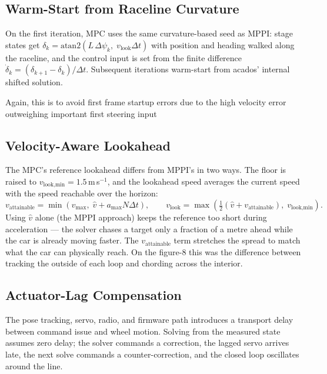 \documentclass[11pt]{article}
\begin{document}
\subsection{Warm-Start from Raceline Curvature}

On the first iteration, MPC uses the same curvature-based seed as MPPI:
stage states get
$\delta_k = \mathrm{atan2}(L\,\Delta\psi_k,\; v_{\text{look}}\Delta t)$ with
position and heading walked along the raceline, and the control input is set
from the finite difference $\dot{\delta}_k = (\delta_{k+1} - \delta_k)/\Delta t$.
Subsequent iterations warm-start from acados' internal shifted solution.

Again, this is to avoid first frame startup errors due to the high velocity error outweighing important first steering input

\subsection{Velocity-Aware Lookahead}

The MPC's reference lookahead differs from MPPI's in two ways.  The floor
is raised to $v_{\text{look,min}} = 1.5$\,m\,s$^{-1}$, and the lookahead
speed averages the current speed with the speed reachable over the horizon:
\[
v_{\text{attainable}} = \min(v_{\max},\; \hat{v} + a_{\max} N \Delta t),
\qquad
v_{\text{look}} = \max\!\left(\tfrac{1}{2}(\hat{v} + v_{\text{attainable}}),\;
                              v_{\text{look,min}}\right).
\]
Using $\hat{v}$ alone (the MPPI approach) keeps the reference too short
during acceleration --- the solver chases a target only a fraction of a
metre ahead while the car is already moving faster.  The
$v_{\text{attainable}}$ term stretches the spread to match what the car
can physically reach.  On the figure-8 this was the difference between
tracking the outside of each loop and chording across the interior.

\subsection{Actuator-Lag Compensation}

The pose tracking, servo, radio, and firmware path introduces a transport delay between
command issue and wheel motion.  Solving from the measured state assumes
zero delay; the solver commands a correction, the lagged servo arrives
late, the next solve commands a counter-correction, and the closed loop
oscillates around the line.
\end{document}
